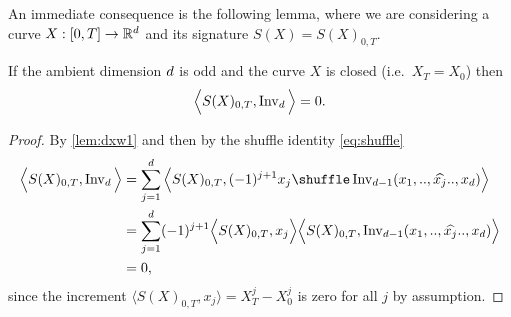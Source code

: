 An immediate consequence is the following lemma, where we are considering a curve $X:[0,T]\to\mathbb{R}^d$ and its signature $S(X)=S(X)_{0,T}$.
\begin{lemma}
  \label{lem:closedCurveOddDimension}
  If the ambient dimension $d$ is odd and the curve $X$ is closed (i.e.~$X_T = X_0$) then
  \begin{align*}
    \Big\langle S(X)_{0,T}, \operatorname{Inv}_{d} \Big\rangle = 0.
  \end{align*}
\end{lemma}
\begin{proof}
  By \autoref{lem:dxw1} and then by the shuffle identity \eqref{eq:shuffle} 
  \begin{align*}
    \Big\langle S(X)_{0,T}, \firstInvariant\ds \Big\rangle
    &=
    \sum_{j=1}^d
    \Big\langle S(X)_{0,T}, 
    (-1)^{j+1}
    x_j \shuffle \firstInvariant{\ds-1}( x_1, .., \widehat{x_j} .., x_\ds )  \Big\rangle \\
    &=
    \sum_{j=1}^d
    (-1)^{j+1}
    \Big\langle S(X)_{0,T}, x_j \Big\rangle
    \Big\langle S(X)_{0,T}, \firstInvariant{\ds-1}( x_1, .., \widehat{x_j} .., x_\ds )  \Big\rangle \\
    &= 0,
  \end{align*}
  since the increment $\Big\langle S(X)_{0,T}, x_j \Big\rangle = X^j_T - X^j_0$ is zero for all $j$ by assumption.
\end{proof}


